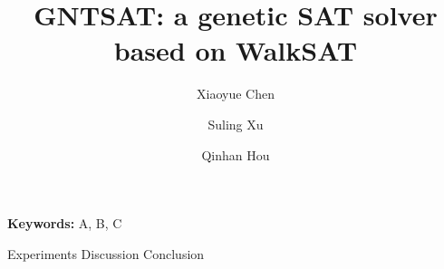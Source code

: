 \documentclass[oneside,twocolumn,a4paper]{article}
\title{GNTSAT: a genetic SAT solver based on WalkSAT}
\author{
	Xiaoyue Chen \and
	Suling Xu \and
	Qinhan Hou
}
\begin{document}
\maketitle

\newline
\newline
{\bf Keywords:} A, B, C




 {Experiments}
 {Discussion}
 {Conclusion}

\printbibliography
\end{document}
